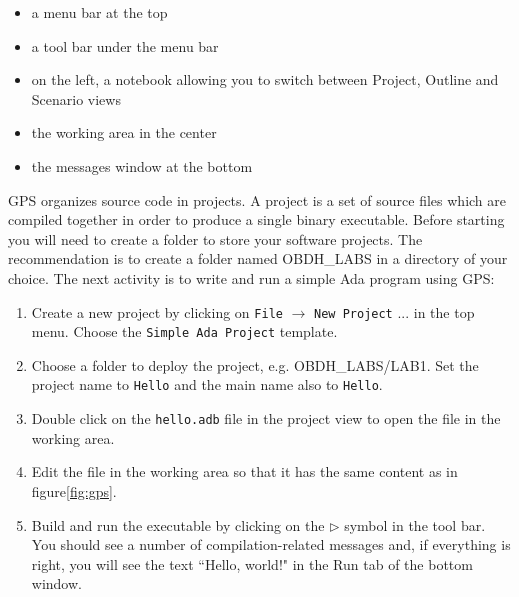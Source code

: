 \begin{itemize}
\item	a menu bar at the top
\item	a tool bar under the menu bar
\item	on the left, a notebook allowing you to switch between Project, Outline and Scenario views
\item	the working area in the center
\item	the messages window at the bottom
\end{itemize}

GPS organizes source code in projects. A project is a set of source files which are compiled together in order to produce a single binary executable. 
Before starting you will need to create a folder to store your software projects. The recommendation is to create a folder named OBDH\_LABS in a directory of your choice.
The next activity is to write and run a simple Ada program using GPS:
\begin{enumerate}
\item 	Create a new project by clicking on {\tt File} $\rightarrow$ {\tt New Project} ... in the top menu. Choose the {\tt Simple Ada Project} template.
\item	Choose a folder to deploy the project, e.g. OBDH\_LABS/LAB1. Set the project name to {\tt Hello} and the main name also to {\tt Hello}.
\item	Double click on the {\tt hello.adb} file in the project view to open the file in the working area. 
\item	Edit the file in the working area so that it has the same content as in figure\ref{fig:gps}.
\item	Build and run the executable by clicking on the $\rhd$ symbol in the tool bar. You should see a number of compilation-related messages and, if everything is right, you will see the text ``Hello, world!" in the Run tab of the bottom window.
\end{enumerate}

